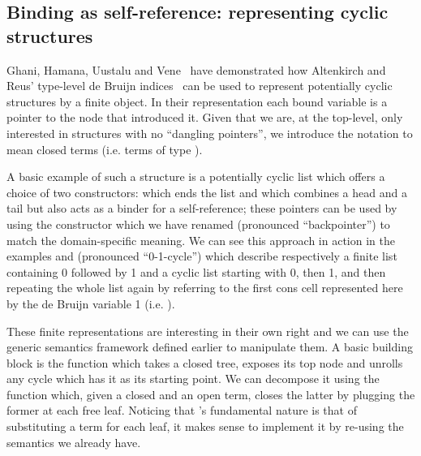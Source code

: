 \subsection{Binding as self-reference: representing cyclic structures}\label{def:colist}

Ghani, Hamana, Uustalu and Vene~\citeyear{ghani2006representing} have
demonstrated how Altenkirch and Reus' type-level de Bruijn
indices~\citeyear{altenkirch1999monadic} can be used to represent
potentially cyclic structures by a finite object. In their
representation each bound variable is a pointer to the node
that introduced it. Given that we are, at the top-level, only
interested in structures with no ``dangling pointers'', we introduce
the notation   to mean closed terms (i.e. terms of type
   \AIC{[]}).

A basic example of such a structure is a potentially cyclic list which
offers a choice of two constructors: \AIC{[]} which ends the list and
\AIC{\_::\_} which combines a head and a tail but also acts as a binder
for a self-reference; these pointers can be used by using the 
constructor which we have renamed  (pronounced ``backpointer'')
to match the domain-specific meaning.
We can see this approach in action in the examples
\AF{[0, 1]} and  (pronounced ``0-1-cycle'') which describe
respectively a finite list containing
0 followed by 1 and a cyclic list starting with 0, then 1, and then
repeating the whole list again by referring to the first cons cell
represented here by the de Bruijn variable 1 (i.e.  ).

\begin{minipage}{\textwidth}
\begin{minipage}{0.55\textwidth}
\end{minipage}\hfill
\begin{minipage}{0.35\textwidth}
\end{minipage}
\end{minipage}

These finite representations are interesting in their own right
and we can use the generic semantics framework defined earlier
to manipulate them. A basic building block is the 
function which takes a closed tree, exposes its top node and
unrolls any cycle which has it as its starting point. We can
decompose it using the  function which, given a closed
and an open term, closes the latter by plugging the former at
each free  leaf. Noticing that 's fundamental nature
is that of substituting a term for each leaf, it makes sense to
implement it by re-using the  semantics we already have.

